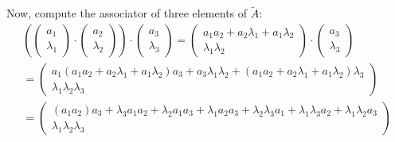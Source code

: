 \documentclass[12pt]{article}
\begin{document}
		Now, compute the associator of three elements of $\tilde{A}$:
		\begin{multline*}
			\left(\begin{pmatrix}
				a_1 \\ \lambda_1
			\end{pmatrix}\cdot \begin{pmatrix}
				a_2 \\ \lambda_2
			\end{pmatrix}\right)\cdot \begin{pmatrix}
				a_3 \\ \lambda_3
			\end{pmatrix}=\begin{pmatrix}
				a_1a_2+a_2\lambda_1+a_1\lambda_2 \\ \lambda_1\lambda_2
			\end{pmatrix}\cdot \begin{pmatrix}
				a_3 \\ \lambda_3
			\end{pmatrix}\\
			=\begin{pmatrix}a_1(a_1a_2+a_2\lambda_1+a_1\lambda_2)a_3+a_3\lambda_1\lambda_2+(a_1a_2+a_2\lambda_1+a_1\lambda_2)\lambda_3 \\ \lambda_1\lambda_2\lambda_3
			\end{pmatrix}\\
			=\begin{pmatrix}
				(a_1a_2)a_3+\lambda_3a_1a_2+\lambda_2a_1a_3+\lambda_1a_2a_3+\lambda_2\lambda_3a_1+\lambda_1\lambda_3a_2+\lambda_1\lambda_2a_3 \\ \lambda_1\lambda_2\lambda_3
			\end{pmatrix}
		\end{multline*}
\end{document}
